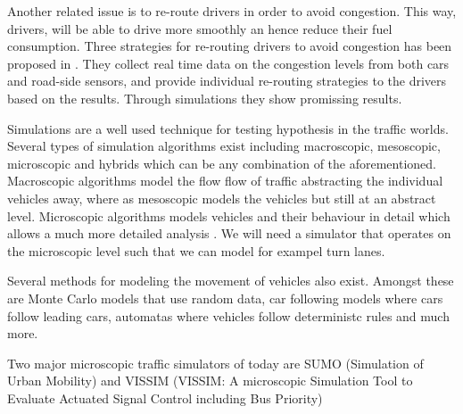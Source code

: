 Another related issue is to re-route drivers in order to avoid congestion. This way, drivers, will be able to drive more smoothly an hence reduce their fuel consumption. 
Three strategies for re-routing drivers to avoid congestion has been proposed in \cite{congestionAvoidance}. They collect real time data on the congestion levels from both cars and road-side sensors, and provide individual re-routing strategies to the drivers based on the results. Through simulations they show promissing results.

Simulations are a well used technique for testing hypothesis in the traffic worlds.
Several types of simulation algorithms exist including macroscopic, mesoscopic, microscopic and hybrids which can be any combination of the aforementioned. Macroscopic algorithms model the flow flow of traffic abstracting the individual vehicles away, where as mesoscopic models the vehicles but still at an abstract level. Microscopic algorithms models vehicles and their behaviour in detail which allows a much more detailed analysis \cite{meso-micro}. We will need a simulator that operates on the microscopic level such that we can model for exampel turn lanes.

Several methods for modeling the movement of vehicles also exist. Amongst these are Monte Carlo models \cite{} that use random data, car following models \cite{} where cars follow leading cars, automatas where vehicles follow deterministc rules \cite{} and much more.

Two major microscopic traffic simulators of today are SUMO (Simulation of Urban Mobility)\cite{sumo} and VISSIM (VISSIM: A microscopic Simulation Tool to Evaluate Actuated Signal Control including Bus Priority)








